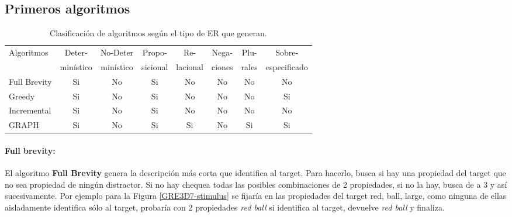 \subsection{Primeros algoritmos}

\label{sec:algoritmos_area}

\begin{table}[h!]
\begin{center}
\begin{tabular}{|l|c|c|c|c|c|c|c|}
\hline
 Algoritmos& Deter- & No-Deter & Propo- & Re- & Nega- & Plu- & Sobre- \\
 & min\'istico & min\'istico & sicional & lacional & ciones & rales & especificado \\
\hline
Full Brevity &Si & No&Si&No&No&No& No \\
Greedy&Si & No&Si&No&No&No& Si \\
Incremental&Si & No&Si&No&No&No& No \\
GRAPH&Si & No&Si&Si&No&Si& Si \\ \hline

\end{tabular}
\caption{Clasificaci\'on de algoritmos seg\'un el tipo de ER que generan.} 
\label{clasificacion_algoritmos}
\vspace*{-.5cm}
\end{center}
\end{table}


 


\paragraph{Full brevity:} El algoritmo {\bf Full Brevity} \cite{Dale:1989:CUR:981623.981632} genera la descripci\'on m\'as corta que identifica al target. Para hacerlo, 
busca si hay una propiedad del target que no sea propiedad de ning\'un distractor. Si no hay chequea todas las posibles combinaciones de 2 propiedades, si no la hay, busca de a 3 y as\'i sucesivamente. Por ejemplo para la Figura \ref{GRE3D7-stimulus} se fijar\'ia en las propiedades del target {red, ball, large}, como ninguna de ellas aisladamente identifica s\'olo al target, probar\'ia con 2 propiedades {\it red ball} si identifica al target, devuelve {\it red ball} y finaliza.

